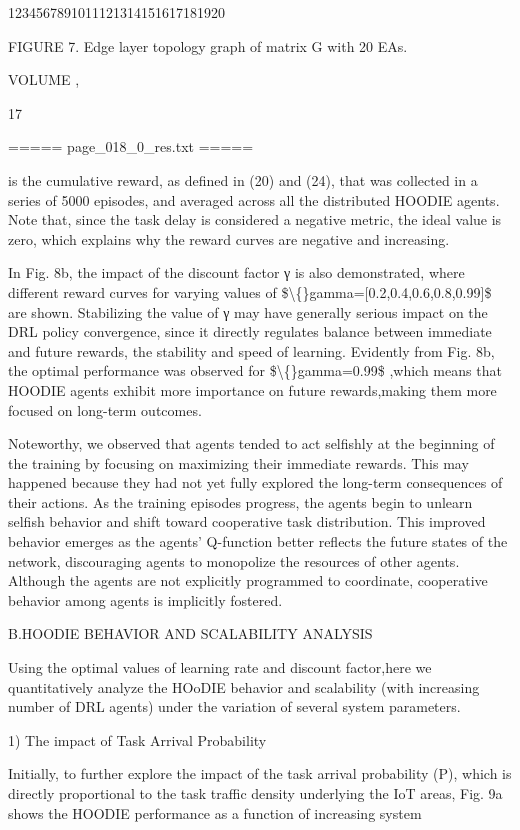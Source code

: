 \documentclass{article}
\begin{document}
1234567891011121314151617181920

FIGURE 7. Edge layer topology graph of matrix G with 20 EAs.

VOLUME ,

17

===== page\_018\_0\_res.txt =====


is the cumulative reward, as defined in (20) and (24), that was collected in a series of 5000 episodes, and averaged across all the distributed HOODIE agents. Note that, since the task delay is considered a negative metric, the ideal value is zero, which explains why the reward curves are negative and increasing.

In Fig. 8b, the impact of the discount factor γ is also demonstrated, where different reward curves for varying values of \$\textbackslash\{\}gamma=[0.2,0.4,0.6,0.8,0.99]\$ are shown. Stabilizing the value of γ may have generally serious impact on the DRL policy convergence, since it directly regulates balance between immediate and future rewards, the stability and speed of learning. Evidently from Fig. 8b, the optimal performance was observed for \$\textbackslash\{\}gamma=0.99\$ ,which means that HOODIE agents exhibit more importance on future rewards,making them more focused on long-term outcomes.

Noteworthy, we observed that agents tended to act selfishly at the beginning of the training by focusing on maximizing their immediate rewards. This may happened because they had not yet fully explored the long-term consequences of their actions. As the training episodes progress, the agents begin to unlearn selfish behavior and shift toward cooperative task distribution. This improved behavior emerges as the agents’ Q-function better reflects the future states of the network, discouraging agents to monopolize the resources of other agents. Although the agents are not explicitly programmed to coordinate, cooperative behavior among agents is implicitly fostered.

B.HOODIE BEHAVIOR AND SCALABILITY ANALYSIS

Using the optimal values of learning rate and discount factor,here we quantitatively analyze the HOoDIE behavior and scalability (with increasing number of DRL agents) under the variation of several system parameters.

1) The impact of Task Arrival Probability

Initially, to further explore the impact of the task arrival probability (P), which is directly proportional to the task traffic density underlying the IoT areas, Fig. 9a shows the HOODIE performance as a function of increasing system
\end{document}
